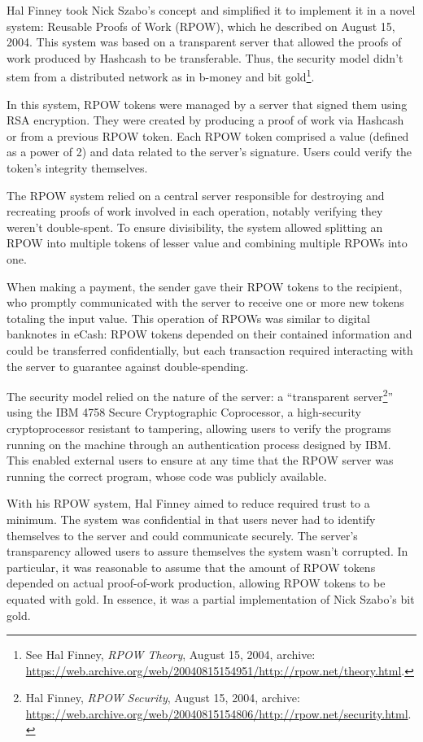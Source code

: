 \documentclass[
  a5paper,
  smalldemyvopaper,10pt,twoside,onecolumn,openright,extrafontsizes,hidelinks]{memoir}
\begin{document}

Hal Finney took Nick Szabo's concept and simplified it to implement it
in a novel system: Reusable Proofs of Work (RPOW), which he described on
August 15, 2004. This system was based on a transparent server that
allowed the proofs of work produced by Hashcash to be transferable.
Thus, the security model didn't stem from a distributed network as in
b-money and bit gold\footnote{See Hal Finney, \emph{RPOW Theory}, August
  15, 2004, archive:
  \url{https://web.archive.org/web/20040815154951/http://rpow.net/theory.html}.}.

In this system, RPOW tokens were managed by a server that signed them
using RSA encryption. They were created by producing a proof of work via
Hashcash or from a previous RPOW token. Each RPOW token comprised a
value (defined as a power of 2) and data related to the server's
signature. Users could verify the token's integrity themselves.

The RPOW system relied on a central server responsible for destroying
and recreating proofs of work involved in each operation, notably
verifying they weren't double-spent. To ensure divisibility, the system
allowed splitting an RPOW into multiple tokens of lesser value and
combining multiple RPOWs into one.

When making a payment, the sender gave their RPOW tokens to the
recipient, who promptly communicated with the server to receive one or
more new tokens totaling the input value. This operation of RPOWs was
similar to digital banknotes in eCash: RPOW tokens depended on their
contained information and could be transferred confidentially, but each
transaction required interacting with the server to guarantee against
double-spending.

The security model relied on the nature of the server: a ``transparent
server\footnote{Hal Finney, \emph{RPOW Security}, August 15, 2004,
  archive:
  \url{https://web.archive.org/web/20040815154806/http://rpow.net/security.html}.}''
using the IBM 4758 Secure Cryptographic Coprocessor, a high-security
cryptoprocessor resistant to tampering, allowing users to verify the
programs running on the machine through an authentication process
designed by IBM. This enabled external users to ensure at any time that
the RPOW server was running the correct program, whose code was publicly
available.

With his RPOW system, Hal Finney aimed to reduce required trust to a
minimum. The system was confidential in that users never had to identify
themselves to the server and could communicate securely. The server's
transparency allowed users to assure themselves the system wasn't
corrupted. In particular, it was reasonable to assume that the amount of
RPOW tokens depended on actual proof-of-work production, allowing RPOW
tokens to be equated with gold. In essence, it was a partial
implementation of Nick Szabo's bit gold.
\end{document}
